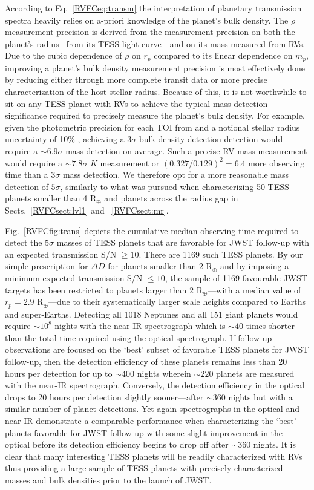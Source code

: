 According to Eq.~\ref{RVFCeq:transm} the interpretation of planetary transmission spectra
heavily relies on a-priori knowledge of the planet's bulk density. The $\rho$ measurement
precision is derived from the measurement precision on both the planet's radius \sigrp{-}--from its
TESS light curve---and on its mass measured from RVs. Due to the cubic dependence
of $\rho$ on $r_p$ compared to its linear dependence on $m_p$, improving a planet's bulk density measurement
precision is most effectively done by reducing \sigrp{} either through more complete
transit data or more precise characterization of the host stellar radius. Because of this, it is not
worthwhile to sit on any TESS planet with RVs to achieve the typical mass detection significance required
to precisely measure the planet's bulk density. For example, given the photometric precision for each TOI
from  and a notional stellar radius uncertainty of 10\% \citep{carter08},
achieving a $3\sigma$ bulk
density detection detection would require a $\sim 6.9\sigma$ mass detection on average. Such a precise RV mass
measurement would require a $\sim 7.8\sigma$ $K$ measurement or $(0.327/0.129)^2 = 6.4$ more observing time
than a $3\sigma$ mass detection. We therefore opt for a more reasonable mass detection of $5\sigma$, similarly to
what was pursued when characterizing 50 TESS planets smaller than 4 R$_{\oplus}$ and planets across the radius gap
in Sects.~\ref{RVFCsect:lvl1} and ~\ref{RVFCsect:mr}.

Fig.~\ref{RVFCfig:trans} depicts the cumulative median observing time required to detect the $5\sigma$ masses
of TESS planets that are favorable for JWST follow-up with an expected transmission S/N $\geq 10$.
There are 1169 such TESS planets. By our simple prescription for $\Delta D$ for planets smaller than 2 R$_{\oplus}$
and by imposing a minimum expected transmission S/N $\leq 10$, the sample of 1169 favourable JWST
targets has been restricted to planets larger than 2 R$_{\oplus}$---with a median value
of $r_p = 2.9$ R$_{\oplus}$---due to their systematically larger scale
heights compared to Earths and super-Earths.
Detecting all 1018 Neptunes and all 151 giant planets would require $\sim 10^8$ nights with the near-IR
spectrograph which is $\sim 40$ times
shorter than the total time required using the optical spectrograph.
If follow-up observations are focused on the `best' subset of favorable TESS planets for JWST follow-up,
then the detection efficiency of these planets remains less than 20 hours per detection for up to $\sim 400$
nights wherein $\sim 220$ planets are measured with the near-IR spectrograph. Conversely, the detection
efficiency in the optical drops to 20 hours per detection slightly sooner---after $\sim 360$ nights but with
a similar number of planet detections.
Yet again spectrographs in the optical and near-IR demonstrate a comparable performance
when characterizing the `best' planets favorable for JWST follow-up with some slight improvement in the
optical before its detection efficiency begins to drop off after $\sim 360$ nights. 
It is clear that many interesting TESS planets will be readily
characterized with RVs thus providing a large sample of TESS planets with precisely characterized masses
and bulk densities prior to the launch of JWST.

